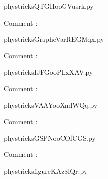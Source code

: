     \newcommand{\CaptionFigQTGHooGVusrk}{<+Type your caption here+>}
    \begin{center}
        
    \end{center}
    phystricksQTGHooGVusrk.py

    Comment : 

    \clearpage
    


    \newcommand{\CaptionFigGrapheVarREGMqx}{<+Type your caption here+>}
    \begin{center}
        
    \end{center}
    phystricksGrapheVarREGMqx.py

    Comment : 

    \clearpage
    


    \newcommand{\CaptionFigIJFGooPLxXAV}{<+Type your caption here+>}
    \begin{center}
        
    \end{center}
    phystricksIJFGooPLxXAV.py

    Comment : 

    \clearpage
    


    \newcommand{\CaptionFigVAAYooXndWQq}{<+Type your caption here+>}
    \begin{center}
        
    \end{center}
    phystricksVAAYooXndWQq.py

    Comment : 

    \clearpage
    


    \newcommand{\CaptionFigGSPNooCOfCGS}{<+Type your caption here+>}
    \begin{center}
        
    \end{center}
    phystricksGSPNooCOfCGS.py

    Comment : 

    \clearpage
    


    \newcommand{\CaptionFigfigureKAzSlQr}{<+Type your caption here+>}
    \begin{center}
        
    \end{center}
    phystricksfigureKAzSlQr.py

